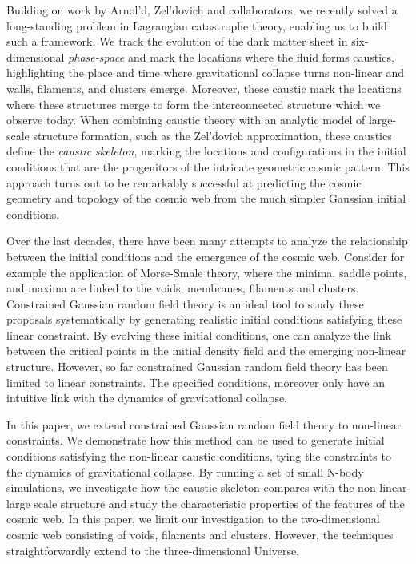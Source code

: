 \documentclass[a4paper, 11pt]{article}
\begin{document}
Building on work by Arnol'd, Zel'dovich and collaborators, we recently solved a long-standing problem in Lagrangian catastrophe theory, enabling us to build such a framework. We track the evolution of the dark matter sheet in six-dimensional \textit{phase-space} and mark the locations where the fluid forms caustics, highlighting the place and time where gravitational collapse turns non-linear and walls, filaments, and clusters emerge. Moreover, these caustic mark the locations where these structures merge to form the interconnected structure which we observe today. When combining caustic theory with an analytic model of large-scale structure formation, such as the Zel'dovich approximation, these caustics define the \textit{caustic skeleton}, marking the locations and configurations in the initial conditions that are the progenitors of the intricate geometric cosmic pattern. This approach turns out to be remarkably successful at predicting the cosmic geometry and topology of the cosmic web from the much simpler Gaussian initial conditions.

Over the last decades, there have been many attempts to analyze the relationship between the initial conditions and the emergence of the cosmic web. Consider for example the application of Morse-Smale theory, where the minima, saddle points, and maxima are linked to the voids, membranes, filaments and clusters. Constrained Gaussian random field theory is an ideal tool to study these proposals systematically by generating realistic initial conditions satisfying these linear constraint. By evolving these initial conditions, one can analyze the link between the critical points in the initial density field and the emerging non-linear structure. However, so far constrained Gaussian random field theory has been limited to linear constraints. The specified conditions, moreover only have an intuitive link with the dynamics of gravitational collapse. 

In this paper, we extend constrained Gaussian random field theory to non-linear constraints. We demonstrate how this method can be used to generate initial conditions satisfying the non-linear caustic conditions, tying the constraints to the dynamics of gravitational collapse. By running a set of small N-body simulations, we investigate how the caustic skeleton compares with the non-linear large scale structure and study the characteristic properties of the features of the cosmic web. In this paper, we limit our investigation to the two-dimensional cosmic web consisting of voids, filaments and clusters. However, the techniques straightforwardly extend to the three-dimensional Universe.
\end{document}
